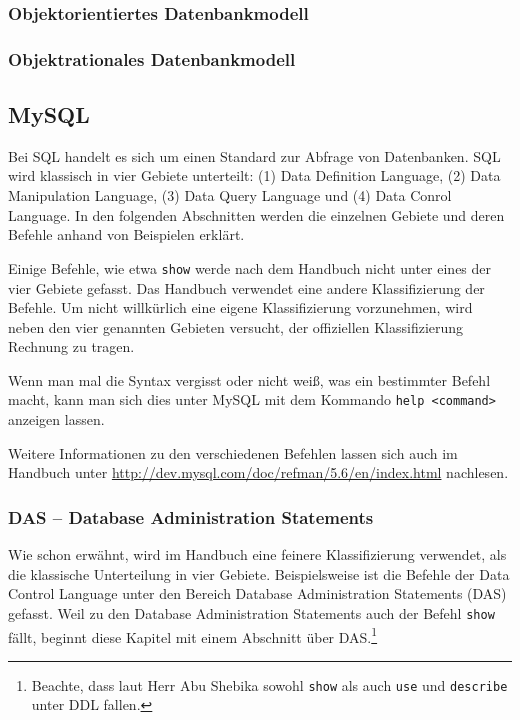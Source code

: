 \subsubsection{Objektorientiertes Datenbankmodell}

\subsubsection{Objektrationales Datenbankmodell}


\subsection{MySQL}

Bei SQL handelt es sich um einen Standard zur Abfrage von Datenbanken. SQL wird klassisch in vier Gebiete unterteilt: (1) Data Definition Language, (2) Data Manipulation Language, (3) Data Query Language und (4) Data Conrol Language. In den folgenden Abschnitten werden die einzelnen Gebiete und deren Befehle anhand von Beispielen erklärt.

Einige Befehle, wie etwa \texttt{show} werde nach dem Handbuch nicht unter eines der vier Gebiete gefasst. Das Handbuch verwendet eine andere Klassifizierung der Befehle. Um nicht willkürlich eine eigene Klassifizierung vorzunehmen, wird neben den vier genannten Gebieten versucht, der offiziellen Klassifizierung Rechnung zu tragen.

Wenn man mal die Syntax vergisst oder nicht weiß, was ein bestimmter Befehl macht, kann man sich dies unter MySQL mit dem Kommando \texttt{help <command>} anzeigen lassen.

Weitere Informationen zu den verschiedenen Befehlen lassen sich auch im Handbuch unter \url{http://dev.mysql.com/doc/refman/5.6/en/index.html} nachlesen.

\subsubsection{DAS -- Database Administration Statements}

Wie schon erwähnt, wird im Handbuch eine feinere Klassifizierung verwendet, als die klassische Unterteilung in vier Gebiete. Beispielsweise ist die Befehle der Data Control Language unter den Bereich Database Administration Statements (DAS) gefasst. Weil zu den Database Administration Statements auch der Befehl \texttt{show} fällt, beginnt diese Kapitel mit einem Abschnitt über DAS.\footnote{Beachte, dass laut Herr Abu Shebika sowohl \texttt{show} als auch \texttt{use} und \texttt{describe} unter DDL fallen.}

